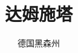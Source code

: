 \documentclass{beamer}
\title{达姆施塔}
\author{德国黑森州}
\begin{document}
\begin{frame}
\titlepage
\end{frame}
\end{document}
